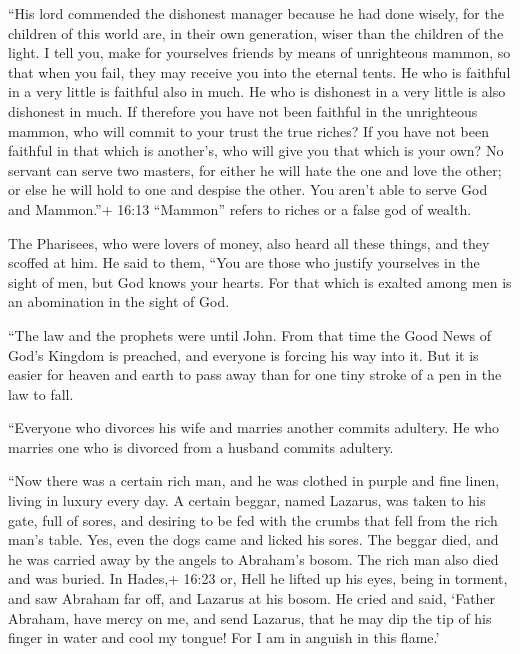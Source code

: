  ``His lord commended the dishonest manager because he had
done wisely, for the children of this world are, in their own
generation, wiser than the children of the light.  I tell
you, make for yourselves friends by means of unrighteous mammon, so that
when you fail, they may receive you into the eternal tents.
 He who is faithful in a very little is faithful also in
much. He who is dishonest in a very little is also dishonest in much.
 If therefore you have not been faithful in the unrighteous
mammon, who will commit to your trust the true riches?  If
you have not been faithful in that which is another's, who will give you
that which is your own?  No servant can serve two masters,
for either he will hate the one and love the other; or else he will hold
to one and despise the other. You aren't able to serve God and
Mammon.''+ 16:13 ``Mammon'' refers to riches or a false god of wealth.

 The Pharisees, who were lovers of money, also heard all
these things, and they scoffed at him.  He said to them,
``You are those who justify yourselves in the sight of men, but God
knows your hearts. For that which is exalted among men is an abomination
in the sight of God.

 ``The law and the prophets were until John. From that time
the Good News of God's Kingdom is preached, and everyone is forcing his
way into it.  But it is easier for heaven and earth to pass
away than for one tiny stroke of a pen in the law to fall.

 ``Everyone who divorces his wife and marries another
commits adultery. He who marries one who is divorced from a husband
commits adultery.

 ``Now there was a certain rich man, and he was clothed in
purple and fine linen, living in luxury every day.  A
certain beggar, named Lazarus, was taken to his gate, full of sores,
 and desiring to be fed with the crumbs that fell from the
rich man's table. Yes, even the dogs came and licked his sores.
 The beggar died, and he was carried away by the angels to
Abraham's bosom. The rich man also died and was buried.  In
Hades,+ 16:23 or, Hell he lifted up his eyes, being in torment, and saw
Abraham far off, and Lazarus at his bosom.  He cried and
said, `Father Abraham, have mercy on me, and send Lazarus, that he may
dip the tip of his finger in water and cool my tongue! For I am in
anguish in this flame.'

